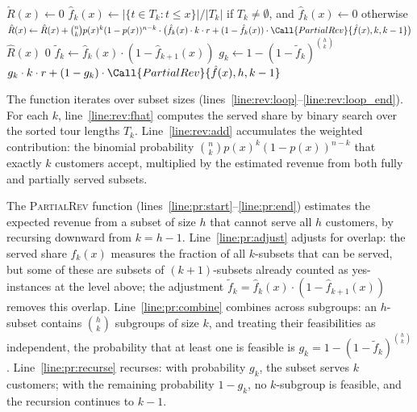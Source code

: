 \documentclass[11pt]{article}
\theoremstyle{plain}
\theoremstyle{definition}
\newcommand{\SingleSpacedXII}{}
\begin{document}
	\begin{algorithm}[htbp]
		\SingleSpacedXII
		\caption{Revenue estimation with partial-service recovery}
		\label{alg:bsh_revenue}
		\begin{algorithmic}[1]
			\State $\hat{R}(x) \gets 0$
			 \label{line:rev:loop}
			\State $\hat{f}_k(x) \gets |\{t \in T_k : t \leq x\}| \big/ |T_k|$ if $T_k \neq \emptyset$, and $\hat{f}_k(x) \gets 0$ otherwise \label{line:rev:fhat}
			\State $\hat{R}(x) \gets \hat{R}(x) + \binom{n}{k} p(x)^k (1-p(x))^{n-k} \cdot \bigl( \hat{f}_k(x) \cdot k \cdot r + (1 - \hat{f}_k(x)) \cdot \Call{PartialRev}{\hat{f}(x), k, k-1} \bigr)$ \label{line:rev:add}
			\EndFor \label{line:rev:loop_end}
			\State \Return $\hat{R}(x)$
			\EndFunction
			\Statex
			 \label{line:pr:start} 
			 \Return $0$ \EndIf \label{line:pr:base} 
			\State $\tilde{f}_k \gets \hat{f}_k(x) \cdot (1 - \hat{f}_{k+1}(x))$ \label{line:pr:adjust} 
			\State $g_k \gets 1 - (1 - \tilde{f}_k)^{\binom{h}{k}}$ \label{line:pr:combine} 
			\State \Return $g_k \cdot k \cdot r + (1 - g_k) \cdot \Call{PartialRev}{\hat{f}(x), h, k-1}$ \label{line:pr:recurse}
			\EndFunction \label{line:pr:end}
		\end{algorithmic}
	\end{algorithm}
	
	The function iterates over subset sizes (lines~\ref{line:rev:loop}--\ref{line:rev:loop_end}).
	For each $k$, line~\ref{line:rev:fhat} computes the served share by binary search over the sorted tour lengths $T_k$.
	Line~\ref{line:rev:add} accumulates the weighted contribution: the binomial probability $\binom{n}{k} p(x)^k (1-p(x))^{n-k}$ that exactly $k$ customers accept, multiplied by the estimated revenue from both fully and partially served subsets.
	
	The \textsc{PartialRev} function (lines~\ref{line:pr:start}--\ref{line:pr:end}) estimates the expected revenue from a subset of size $h$ that cannot serve all $h$ customers, by recursing downward from $k = h - 1$.
	Line~\ref{line:pr:adjust} adjusts for overlap: the served share $\hat{f}_k(x)$ measures the fraction of all $k$-subsets that can be served, but some of these are subsets of $(k{+}1)$-subsets already counted as yes-instances at the level above; the adjustment $\tilde{f}_k = \hat{f}_k(x) \cdot (1 - \hat{f}_{k+1}(x))$ removes this overlap.
	Line~\ref{line:pr:combine} combines across subgroups: an $h$-subset contains $\binom{h}{k}$ subgroups of size $k$, and treating their feasibilities as independent, the probability that at least one is feasible is $g_k = 1 - (1 - \tilde{f}_k)^{\binom{h}{k}}$.
	Line~\ref{line:pr:recurse} recurses: with probability $g_k$, the subset serves $k$ customers; with the remaining probability $1 - g_k$, no $k$-subgroup is feasible, and the recursion continues to $k - 1$.
	
\end{document}
